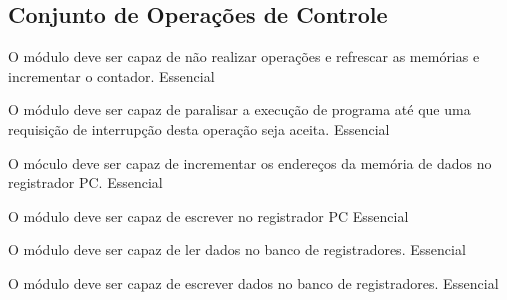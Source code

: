 \subsection{Conjunto de Operações de Controle}
	    
	\begin{functional}
		
		{O módulo deve ser capaz de não realizar operações e refrescar as memórias e incrementar o contador.}
		{Essencial} 
       
        {O módulo deve ser capaz de paralisar a execução de programa até que uma requisição de interrupção desta operação seja aceita.}
        {Essencial}
        
        {O móculo deve ser capaz de incrementar os endereços da memória de dados no registrador PC.}
 		{Essencial}
 		
 		{O módulo deve ser capaz de escrever no registrador PC}
 		{Essencial}  
 		
 		{O módulo deve ser capaz de ler dados no banco de registradores.}
 		{Essencial}
 		
 		
 		{O módulo deve ser capaz de escrever dados no banco de registradores.}
 		{Essencial}
 		
	  \end{functional}